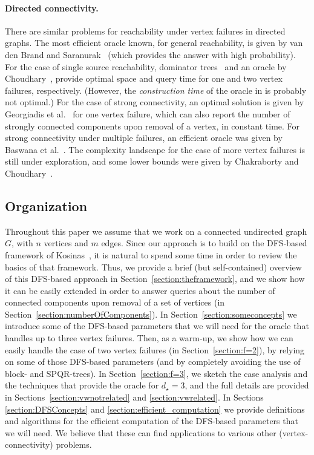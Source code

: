 \documentclass[11pt,a4paper]{article}
\begin{document}
\paragraph{Directed connectivity.}
There are similar problems for reachability under vertex failures in directed graphs. The most efficient oracle known, for general reachability, is given by van den Brand and Saranurak~\cite{DBLP:conf/focs/BrandS19} (which provides the answer with high probability). For the case of single source reachability, dominator trees~\cite{DBLP:journals/siamcomp/BuchsbaumGKRTW08} and an oracle by Choudhary~\cite{DBLP:conf/icalp/Choudhary16}, provide optimal space and query time for one and two vertex failures, respectively. (However, the \emph{construction time} of the oracle in \cite{DBLP:conf/icalp/Choudhary16} is probably not optimal.) For the case of strong connectivity, an optimal solution is given by Georgiadis et al.~\cite{DBLP:journals/siamcomp/GeorgiadisIP20} for one vertex failure, which can also report the number of strongly connected components upon removal of a vertex, in constant time. For strong connectivity under multiple failures, an efficient oracle was given by Baswana et al.~\cite{DBLP:journals/algorithmica/BaswanaCR19}. The complexity landscape for the case of more vertex failures is still under exploration, and some lower bounds were given by Chakraborty and Choudhary~\cite{DBLP:conf/icalp/ChakrabortyC20}.

\subsection{Organization}
Throughout this paper we assume that we work on a connected undirected graph $G$, with $n$ vertices and $m$ edges.
Since our approach is to build on the DFS-based framework of Kosinas~\cite{DBLP:conf/esa/Kosinas23}, it is natural to spend some time in order to review the basics of that framework. Thus, we provide a brief (but self-contained) overview of this DFS-based approach in Section~\ref{section:theframework}, and we show how it can be easily extended in order to answer queries about the number of connected components upon removal of a set of vertices (in Section~\ref{section:numberOfComponents}). In Section~\ref{section:someconcepts} we introduce some of the DFS-based parameters that we will need for the oracle that handles up to three vertex failures. Then, as a warm-up, we show how we can easily handle the case of two vertex failures (in Section~\ref{section:f=2}), by relying on some of those DFS-based parameters (and by completely avoiding the use of block- and SPQR-trees). In Section~\ref{section:f=3}, we sketch the case analysis and the techniques that provide the oracle for $d_{\star}=3$, and the full details are provided in Sections~\ref{section:vwnotrelated} and \ref{section:vwrelated}. In Sections \ref{section:DFSConcepts} and \ref{section:efficient_computation} we provide definitions and algorithms for the efficient computation of the DFS-based parameters that we will need. We believe that these can find applications to various other (vertex-connectivity) problems.
\end{document}
